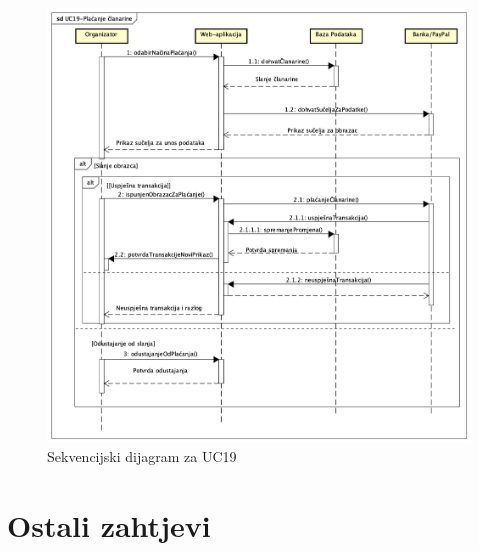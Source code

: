 				\begin{figure}[H]
					\includegraphics[scale=0.5]{dijagrami/sd-UC19-Placanje-clanarine.png} %
					\centering
					\caption{Sekvencijski dijagram za UC19}
					\label{fig:promjene}
				\end{figure}
				\eject		
				
		\section{Ostali zahtjevi}

